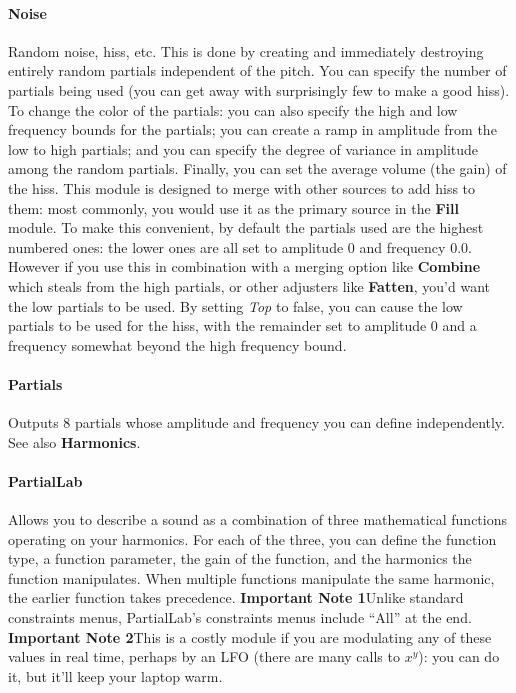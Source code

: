 \documentclass{article}
\begin{document}

\paragraph{Noise}  Random noise, hiss, etc.  This is done by creating and immediately destroying entirely random partials independent of the pitch.  You can specify the number of partials being used (you can get away with surprisingly few to make a good hiss).   To change the color of the partials: you can also specify the high and low frequency bounds for the partials; you can create a ramp in amplitude from the low to high partials; and you can specify the degree of variance in amplitude among the random partials.  Finally, you can set the average volume (the gain) of the hiss.  This module is designed to merge with other sources to add hiss to them: most commonly, you would use it as the primary source in the {\bf Fill} module.  To make this convenient, by default the partials used are the highest numbered ones: the lower ones are all set to amplitude 0 and frequency 0.0.  However if you use this in combination with a merging option like {\bf Combine} which steals from the high partials, or other adjusters like {\bf Fatten}, you'd want the low partials to be used.  By setting {\it Top} to false, you can cause the low partials to be used for the hiss, with the remainder set to amplitude 0 and a frequency somewhat beyond the high frequency bound.

\paragraph{Partials}  Outputs 8 partials whose amplitude and frequency you can define independently.  See also {\bf Harmonics}.

\paragraph{PartialLab}  Allows you to describe a sound as a combination of three mathematical functions operating on your harmonics.  For each of the three, you can define the function type, a function parameter, the gain of the function, and the harmonics the function manipulates.  When multiple functions manipulate the same harmonic, the earlier function takes precedence.  {\bf Important Note 1}\quad Unlike standard constraints menus, PartialLab's constraints menus include ``All'' at the end.  {\bf Important Note 2}\quad This is a costly module if you are modulating any of these values in real time, perhaps by an LFO (there are many calls to \(x^y\)): you can do it, but it'll keep your laptop warm.
\end{document}
